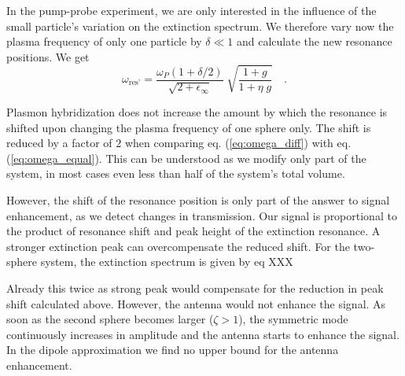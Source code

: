 In the pump-probe experiment, we are only interested in the influence of the
small particle's variation on the extinction spectrum. We therefore vary now the
plasma frequency of only one particle by $\delta \ll 1$ and calculate the new
resonance positions. We get
%
\begin{equation} \label{eq:omega_diff}
 \omega_{\text{res'}} = \frac{\omega_P (1 + \delta / 2)}{\sqrt{2 + \epsilon_{\infty}} }
 \; \sqrt{ \frac{1 + g}{ 1 +  \eta \; g}} \quad .
\end{equation}

Plasmon hybridization does not increase the amount by which the resonance is
shifted upon changing the plasma frequency of one sphere only. The shift is reduced by a factor of $2$ when comparing 
 eq. (\ref{eq:omega_diff})  with  eq.
(\ref{eq:omega_equal}). This can be understood
as we modify only part of the system,  in most cases even less than half of the
system's total volume.


However, the shift of the resonance position is only part of the answer to
signal enhancement, as we detect changes in transmission. Our signal is
proportional to the product of resonance shift and peak height of the extinction
resonance. A stronger extinction peak can overcompensate the reduced shift. For
the two-sphere system, the extinction spectrum is given by  eq XXX

Already this twice as strong peak would compensate for the
reduction in peak shift calculated above. However, the antenna would not
enhance the signal. As soon as the second sphere becomes larger ($\zeta > 1$),
the symmetric mode continuously increases in amplitude and the antenna starts to
enhance the signal. In the dipole approximation we find  no upper bound for the
antenna enhancement.




\printbibliography[segment=\therefsegment,heading=subbibliography]
